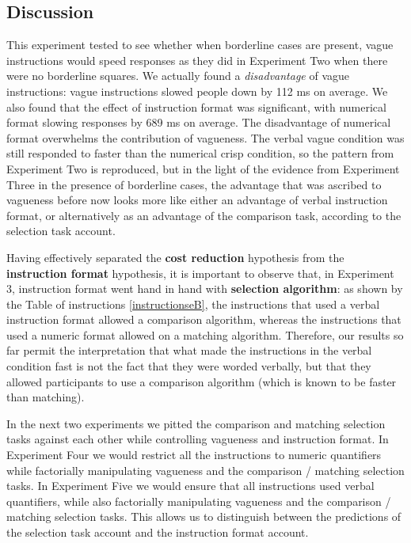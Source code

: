 \documentclass[doc,apacite]{apa6}
\begin{document}
\subsection{Discussion}

This experiment tested to see whether when borderline cases are present, vague instructions would speed responses as they did in Experiment Two when there were no borderline squares. We actually found a \emph{disadvantage} of vague instructions: vague instructions slowed people down by 112 ms on average. We also found that the effect of instruction format was significant, with numerical format slowing responses by 689 ms on average. The disadvantage of numerical format overwhelms the contribution of vagueness. The verbal vague condition was still responded to faster than the numerical crisp condition, so the pattern from Experiment Two is reproduced, but in the light of the evidence from Experiment Three in the presence of borderline cases, the advantage that was ascribed to vagueness before now looks more like either an advantage of verbal instruction format, or alternatively as an advantage of the comparison task, according to the selection task account.

Having effectively separated the {\bf cost reduction} hypothesis from the {\bf instruction format} hypothesis, it is important to observe that, in Experiment 3, instruction format went hand in hand with {\bf selection algorithm}: as shown by the Table of instructions \ref{instructionseB}, the instructions that used a verbal instruction format allowed a comparison algorithm, whereas the instructions that used a numeric format allowed on a matching algorithm. Therefore, our results so far permit the interpretation that what made the instructions in the verbal condition fast is not the fact that they were worded verbally, but that they allowed participants to use a comparison algorithm (which is known to be faster than matching). %

In the next two experiments we pitted the comparison and matching selection tasks against each other while controlling vagueness and instruction format. In Experiment Four we would restrict all the instructions to numeric quantifiers while factorially manipulating vagueness and the comparison / matching selection tasks. In Experiment Five we would ensure that all instructions used verbal quantifiers, while also factorially manipulating vagueness and the comparison / matching selection tasks. This allows us to distinguish between the predictions of the selection task account and the instruction format account. 
\end{document}
